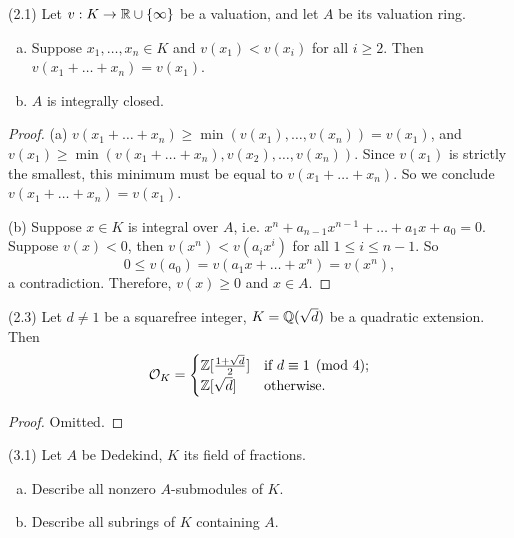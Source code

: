 \documentclass[11pt]{amsart}
\begin{document}
(2.1)
    Let $v:K\to \mathbb{R}\cup\{\infty\}$ be a valuation, and let $A$ be its valuation ring.
    \begin{enumerate}[(a)]
        \item Suppose $x_1,\dots,x_n\in K$ and $v(x_1) < v(x_i)$ for all $i\ge 2$. Then $v(x_1+\dots+x_n) = v(x_1)$.
        \item $A$ is integrally closed.
    \end{enumerate}

\begin{proof}
    (a) $v(x_1 + \dots + x_n)\ge \min(v(x_1), \dots,v(x_n)) = v(x_1)$, and $v(x_1)\ge \min(v(x_1+\dots+x_n), v(x_2),\dots,v(x_n))$. Since $v(x_1)$ is strictly the smallest, this minimum must be equal to $v(x_1+\dots+x_n)$. So we conclude $v(x_1+\dots+x_n) = v(x_1)$.

    (b) Suppose $x\in K$ is integral over $A$, i.e. $x^n + a_{n-1}x^{n-1} + \dots + a_1x + a_0 = 0$. Suppose $v(x) < 0$, then $v(x^n) < v(a_ix^i)$ for all $1\le i\le n-1$. So
    \[0\le v(a_0) = v(a_1x + \dots + x^n) = v(x^n),\]
    a contradiction. Therefore, $v(x)\ge 0$ and $x\in A$.
\end{proof}

(2.3)
Let $d\neq 1$ be a squarefree integer, $K = \mathbb{Q}(\sqrt{d})$ be a quadratic extension. Then
\[\mathcal{O}_K = \begin{cases}
\mathbb{Z}[\frac{1+\sqrt{d}}{2}] & \text{if } d\equiv 1\pmod{4};\\
\mathbb{Z}[\sqrt{d}] & \text{otherwise}.
\end{cases}\]

\begin{proof}
    Omitted.
\end{proof}


(3.1) Let $A$ be Dedekind, $K$ its field of fractions.
\begin{enumerate}[(a)]
    \item Describe all nonzero $A$-submodules of $K$.
    \item Describe all subrings of $K$ containing $A$.
\end{enumerate}
\end{document}
